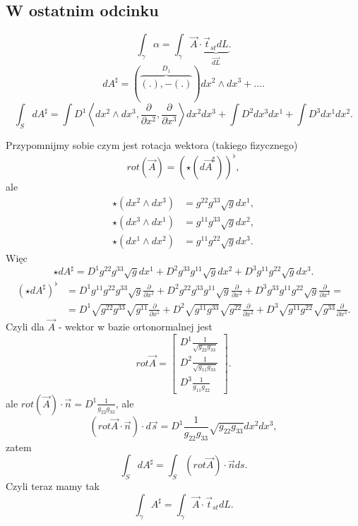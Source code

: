 \documentclass[../main.tex]{subfiles}
\begin{document}
    \subsection{W ostatnim odcinku}
    \[
        \int_\gamma \alpha = \int_\gamma \vec{A}\cdot \underbrace{\vec{t}_{st}dL}_{\vec{dL}}
    .\]
\[
    dA^\sharp = \left( \overbrace{\left( . \right) , - \left( . \right)}^{D_1}  \right)dx^2\land dx^3 + \ldots
.\]
\[
    \int_S dA^\sharp = \int D^1\left<dx^2\land dx^3, \frac{\partial }{\partial x^2} , \frac{\partial }{\partial x^3}  \right>dx^2dx^3 + \int D^2 dx^{3} dx^{1} + \int D^3 dx^{1} dx^{2}
.\]

Przypomnijmy sobie czym jest rotacja wektora (takiego fizycznego)
\[
    rot(\vec{A}) = \left( \star\left( d\vec{A}^\sharp \right)  \right) ^\flat
,\]
ale
\begin{align*}
    \star(dx^{2} \land dx^{3} ) &= g^{22}g^{33}\sqrt{g}dx^{1},\\
    \star(dx^{3} \land dx^{1} ) &= g^{11}g^{33}\sqrt{g} dx^{2} ,\\
    \star(dx^{1} \land dx^{2} ) &= g^{11}g^{22}\sqrt{g} dx^{3}
.\end{align*}
Więc
\[
    \star dA^\sharp = D^1 g^{22}g^{33}\sqrt{g} dx^{1} + D^2 g^{33}g^{11}\sqrt{g} dx^{2} + D^3 g^{11}g^{22}\sqrt{g} dx^{3}
.\]
\begin{align*}
    \left( \star dA^\sharp \right) ^\flat &= D^1 g^{11}g^{22}g^{33}\sqrt{g} \frac{\partial }{\partial x^1} + D^2 g^{22}g^{33}g^{11}\sqrt{g} \frac{\partial }{\partial x^2} + D^3 g^{33}g^{11}g^{22}\sqrt{g} \frac{\partial }{\partial x^3}  =\\
    &= D^1 \sqrt{g^{22}g^{33}} \sqrt{g^{11}} \frac{\partial }{\partial x^1} + D^2 \sqrt{g^{11}g^{33}} \sqrt{g^{22}} \frac{\partial }{\partial x^2} + D^3 \sqrt{g^{11}g^{22}} \sqrt{g^{33}} \frac{\partial }{\partial x^3}
.\end{align*}
Czyli dla $\vec{A}$ - wektor w bazie ortonormalnej jest
\[
    rot \vec{A} = \begin{bmatrix} D^1 \frac{1}{\sqrt{g_{22}g_{33}} }\\ D^2 \frac{1}{\sqrt{g_{11}g_{33}}}\\ D^3 \frac{1}{g_{11}g_{22}} \end{bmatrix}
.\]
ale $rot(\vec{A})\cdot \vec{n} = D^1 \frac{1}{g_{22}g_{33}}$, ale
\[
    \left( rot \vec{A}\cdot \vec{n} \right) \cdot d\vec{s} = D^1 \frac{1}{g_{22}g_{33}}\sqrt{g_{22}g_{33}}dx^{2} dx^{3}
,\]
zatem
\[
    \int_S dA^\sharp = \int_S (rot \vec{A}) \cdot \vec{n}  ds
.\]
Czyli teraz mamy tak
\[
    \int_\gamma A^\sharp = \int_\gamma \vec{A}\cdot \vec{t}_{st}dL
.\]
\end{document}
